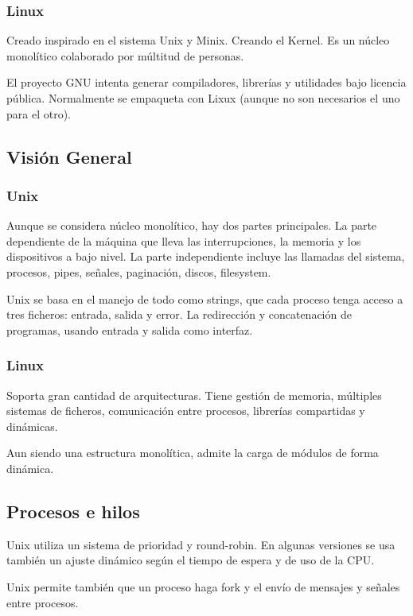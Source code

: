     \subsubsection{Linux}
        Creado inspirado en el sistema Unix y Minix. Creando el Kernel. Es un núcleo monolítico colaborado por múltitud de personas.

        El proyecto GNU intenta generar compiladores, librerías y utilidades bajo licencia pública. Normalmente se empaqueta con Lixux (aunque no son necesarios el uno para el otro).

\subsection{Visión General}
    \subsubsection{Unix}
        Aunque se considera núcleo monolítico, hay dos partes principales. La parte dependiente de la máquina que lleva las interrupciones, la memoria y los dispositivos a bajo nivel. La parte independiente incluye las llamadas del sistema, procesos, pipes, señales, paginación, discos, filesystem.

        Unix se basa en el manejo de todo como strings, que cada proceso tenga acceso a tres ficheros: entrada, salida y error. La redirección y concatenación de programas, usando entrada y salida como interfaz.

    \subsubsection{Linux}
        Soporta gran cantidad de arquitecturas. Tiene gestión de memoria, múltiples sistemas de ficheros, comunicación entre procesos, librerías compartidas y dinámicas.

        Aun siendo una estructura monolítica, admite la carga de módulos de forma dinámica.

\subsection{Procesos e hilos}
    Unix utiliza un sistema de prioridad y round-robin. En algunas versiones se usa también un ajuste dinámico según el tiempo de espera y de uso de la CPU.

    Unix permite también que un proceso haga fork y el envío de mensajes y señales entre procesos.

